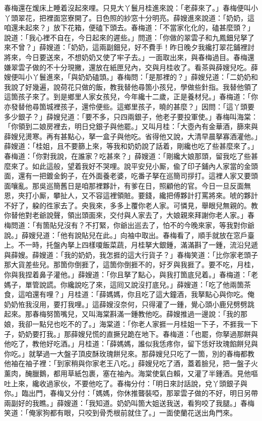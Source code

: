 春梅還在煖床上睡着沒起來哩。{}只見大丫鬟月桂進來說：「老薛來了。」春梅便叫小丫頭翠花，把裡面窓寮開了。日色照的紗窓十分明亮。薛嫂進來說道：「奶奶，這咱還未起來？」放下花箱，便磕下頭去。春梅道：「不當家化化的，磕甚麼頭？」說道：「我心裡不自在，今日起來的遲些。」問道：「你做的翠雲子和九鳳鈿兒拏了來不曾？」薛嫂道：「奶奶，這兩副鈿兒，好不費手！昨日晚夕我纔打翠花鋪裡討將來，今日要送來，不想奶奶又使了牢子去。」一面取出來，與春梅過目。春梅還嫌翠雲子做的不十分現撇，{}還放在紙匣兒內，交與月桂收了。看茶與薛嫂兒吃。薛嫂便叫小丫鬟進來，「與奶奶磕頭。」春梅問：「是那裡的？」薛嫂兒道：「二奶奶和我說了好幾遍，說荷花只做的飯，教我替他尋箇小孩兒，學做些針指。我替他領了這箇孩子來了。到是鄉里人家女孩兒，今年纔十二歲，正是養材兒。」春梅道：「你亦發替他尋箇城裡孩子，還伶便些。這鄉里孩子，曉的甚麼？」因問：「這丫頭要多少銀子？」薛嫂兒道：「要不多，只四兩銀子，他老子要投軍使。」春梅叫海棠：「你領到二娘房裡去，明日兌銀子與他罷。」又叫月桂：「大壺內有金華酒，篩來與薛嫂兒燙寒。再有甚點心，拏一盒子與他吃。省得他又說，大清早晨拏寡酒灌他。」薛嫂道：「桂姐，且不要篩上來，等我和奶奶說了話着，剛纔也吃了些甚麼來了。」春梅道：「你對我說，在誰家？吃甚來？」薛嫂道：「剛纔大娘那頭，留我吃了些甚麼來了。如此這般，望着我好不哭哩。說平安兒小厮，偸了印子鋪內人家當的金頭面，還有一把鍍金鉤子，在外面養老婆，吃番子拏在巡簡司拶打。這裡人家又要頭面嚷亂。那吳巡簡舊日是咱那裡夥計，有爹在日，照顧他的官。今日一旦反面無恩，夾打小厮，攀扯人，又不容這裡領賍。要錢，纔把傅夥計打罵將來。唬的夥計不好了，躱的徃家去了。央我來，多多上覆你老人家。可憐見，舉眼兒無親的。教你替他對老爺說聲，領出頭面來，交付與人家去了，大娘親來拜謝你老人家。」春梅問道：「有箇貼兒沒有？不打緊，你爺出巡去了，怕不的今晚來家，等我對你爺說。」{}薛嫂兒道：「他有說貼兒在此。」向袖中取出。春梅看了，順手就放在窓戶臺上。不一時，托盤內拏上四樣嗄飯菜蔬，月桂拏大銀鍾，滿滿斟了一鍾，流沿兒遞與薛嫂。薛嫂道：「我的奶奶，我怎捱的這大行貨子？」春梅笑道：「比你家老頭子那大貨差些兒。{}那箇你倒捱了，這箇你倒捱不的，好歹與我捱了。要不吃，月桂，你與我捏着鼻子灌他。」薛嫂道：「你且拏了點心，與我打箇底兒着。」春梅道：「老媽子，單管說謊。你纔說吃了來，這囘又說沒打底兒。」薛嫂道：「吃了他兩箇茶食，這咱還有哩？」月桂道：「薛媽媽，你且吃了這大鐘酒，我拏點心與你吃。俺奶奶恠我沒用，要打我哩。」這薛嫂沒奈何，只得灌了一鍾，覺心頭小鹿兒劈劈跳起來。那春梅努箇嘴兒，又叫海棠斟滿一鍾教他吃。薛嫂推過一邊說：「我的那娘，我卻一點兒也吃不的了。」海棠道：「你老人家捱一月桂姐一下子，不捱我一下子，奶奶要打我。」那薛嫂兒慌的直撅兒跪在地下。春梅道：「也罷，你拏過那餅與他吃了，教他好吃酒。」月桂道：「薛媽媽，誰似我恁疼你，留下恁好玫瑰餡餅兒與你吃。」就拏過一大盤子頂皮酥玫瑰餅兒來。那薛嫂兒只吃了一箇，別的春梅都教他袖在袖子裡：「到家稍與你家老王八吃。」薛嫂兒吃了酒，蓋着臉兒，把一盤子火薰肉，醃臘鵝，都用草紙包裹，塞在袖內。{}海棠使氣白賴，又灌了半鍾酒。見他嘔吐上來，纔收過家伙，不要他吃了。春梅分付：「明日來討話說，兌丫頭銀子與你。」臨出門，春梅又分付：「媽媽，你休推聾裝啞，那翠雲子做的不好，明日另帶兩副好的我瞧。」薛嫂道：「我知道。奶奶叫箇大姐送我送，看狗咬了我腿。」春梅笑道：「俺家狗都有眼，只咬到骨禿根前就住了。」{}一面使蘭花送出角門來。


